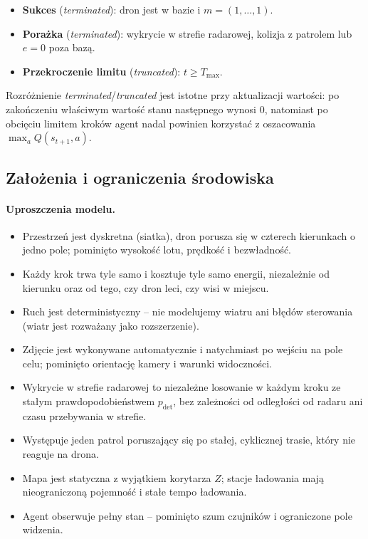 \begin{itemize}
  \item \textbf{Sukces} (\textit{terminated}): dron jest w bazie i $m = (1,\dots,1)$.
  \item \textbf{Porażka} (\textit{terminated}): wykrycie w strefie radarowej,
        kolizja z patrolem lub $e = 0$ poza bazą.
  \item \textbf{Przekroczenie limitu} (\textit{truncated}): $t \ge T_{\max}$.
\end{itemize}

Rozróżnienie \textit{terminated}/\textit{truncated} jest istotne przy
aktualizacji wartości: po zakończeniu właściwym wartość stanu następnego
wynosi $0$, natomiast po obcięciu limitem kroków agent nadal powinien
korzystać z oszacowania $\max_a Q(s_{t+1},a)$.

\subsection{Założenia i ograniczenia środowiska}

\paragraph{Uproszczenia modelu.}
\begin{itemize}
  \item Przestrzeń jest dyskretna (siatka), dron porusza się w czterech
        kierunkach o jedno pole; pominięto wysokość lotu, prędkość
        i bezwładność.
  \item Każdy krok trwa tyle samo i kosztuje tyle samo energii, niezależnie
        od kierunku oraz od tego, czy dron leci, czy wisi w miejscu.
  \item Ruch jest deterministyczny -- nie modelujemy wiatru ani błędów
        sterowania (wiatr jest rozważany jako rozszerzenie).
  \item Zdjęcie jest wykonywane automatycznie i natychmiast po wejściu na pole
        celu; pominięto orientację kamery i warunki widoczności.
  \item Wykrycie w strefie radarowej to niezależne losowanie w każdym kroku
        ze stałym prawdopodobieństwem $p_{\text{det}}$, bez zależności od
        odległości od radaru ani czasu przebywania w strefie.
  \item Występuje jeden patrol poruszający się po stałej, cyklicznej trasie,
        który nie reaguje na drona.
  \item Mapa jest statyczna z wyjątkiem korytarza $Z$; stacje ładowania mają
        nieograniczoną pojemność i stałe tempo ładowania.
  \item Agent obserwuje pełny stan -- pominięto szum czujników i ograniczone
        pole widzenia.
\end{itemize}

